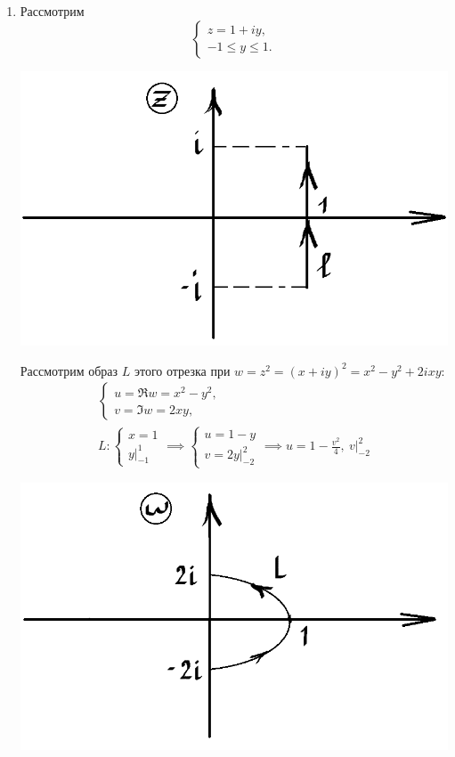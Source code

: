 \documentclass[../../main.tex]{subfiles}
\begin{document}
\begin{examples}

\;

\begin{enumerate}
\item Рассмотрим
\begin{equation*}
    \begin{cases}
        z = 1 + iy,\\
        -1 \leq y \leq 1.
    \end{cases}
\end{equation*}
\begin{center}
\includegraphics[height=0.3\textwidth]{lec30_1.png}
\end{center}

Рассмотрим образ $L$ этого отрезка при 
$w = z^2 = (x + iy)^2 = x^2 - y^2 + 2ixy$:
\begin{gather*}
    \begin{cases}
        u = \Re w = x^2 - y^2,\\
        v = \Im w = 2xy,
    \end{cases} \\
    L:
    \begin{cases}
        x = 1\\
        y|_{-1}^1
    \end{cases}
    \implies
    \begin{cases}
        u = 1 - y\\
        v = 2y|_{-2}^2
    \end{cases}
    \implies
    u = 1 - \frac{v^2}{4},\ v|_{-2}^2 
\end{gather*}

\begin{center}
\includegraphics[height=0.3\textwidth]{lec30_2.png}
\end{center}


\end{enumerate}
\end{examples}
\end{document}
